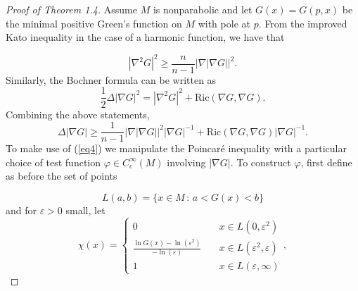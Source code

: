 \documentclass{amsart}
\theoremstyle{definition}
\theoremstyle{remark}
\numberwithin{equation}{section}
\begin{document}
\begin{proof}[Proof of Theorem 1.4] Assume $M$ is nonparabolic and let $G(x)=G(p,x)$ be the minimal positive Green's function on $M$ with pole at $p$. From the improved Kato inequality in the case of a harmonic function, we have that

\begin{equation*}
|\nabla^2G|^2\geq \frac{n}{n-1}|\nabla|\nabla G||^2.
\end{equation*}
Similarly, the Bochner formula can be written as
\begin{equation*}
\frac{1}{2}\Delta |\nabla G|^2=|\nabla^2G|^2+\text{Ric}(\nabla G,\nabla G).
\end{equation*}
Combining the above statements,
\begin{equation}
\label{eq4}
    \Delta|\nabla G|\geq \frac{1}{n-1}|\nabla|\nabla G||^2|\nabla G|^{-1}+\text{Ric}(\nabla G,\nabla G)|\nabla G|^{-1}. 
\end{equation}
To make use of (\ref{eq4}) we manipulate the Poincar\'e inequality with a particular choice of test function $\varphi\in C^\infty_c(M)$ involving $|\nabla G|$. To construct $\varphi$, first define as before the set of points

\begin{equation*}
L(a,b)=\{x\in M\,:\, a<G(x)<b\}
\end{equation*}
and for $\varepsilon>0$ small, let 
\[
\chi(x) = 
\begin{cases} 
    0               &\quad x\in L(0,\varepsilon^2)\\
    \frac{\ln G(x) - \ln(\varepsilon^2)}{-\ln(\varepsilon)}         &\quad x\in L(\varepsilon^2,\varepsilon)\\
    1               &\quad x\in L(\varepsilon,\infty)
\end{cases},
\]


\end{proof}
\end{document}
